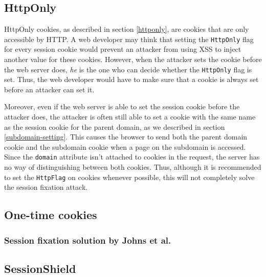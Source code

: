 \subsection{HttpOnly}\label{httponlyremark}

HttpOnly cookies, as described in section \ref{httponly}, are cookies that are only accessible by HTTP. A web developer may think that setting the \texttt{HttpOnly} flag for every session cookie would prevent an attacker from using XSS to inject another value for these cookies. However, when the attacker sets the cookie before the web server does, \emph{he} is the one who can decide whether the \texttt{HttpOnly} flag is set. Thus, the web developer would have to make sure that a cookie is always set before an attacker can set it.

Moreover, even if the web server is able to set the session cookie before the attacker does, the attacker is often still able to set a cookie with the same name as the session cookie for the parent domain, as we described in section \ref{subdomain-setting}. This causes the browser to send both the parent domain cookie and the subdomain cookie when a page on the subdomain is accessed. Since the \texttt{domain} attribute isn't attached to cookies in the request, the server has no way of distinguishing between both cookies. Thus, although it is recommended to set the \texttt{HttpFlag} on cookies whenever possible, this will not completely solve the session fixation attack.

\subsection{One-time cookies}


\subsubsection{Session fixation solution by Johns et al.}


\subsection{SessionShield}

